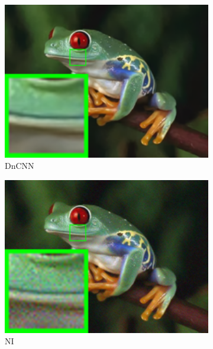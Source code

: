 \begin{figure}
\begin{subfigure}[t]{0.19\textwidth}
        \includegraphics[width=1\textwidth]{images/guided/nc/resize_br_DnCNN_frog.png}
		\caption{DnCNN}
    \end{subfigure}
    \hfill
    \begin{subfigure}[t]{0.19\textwidth}
        \centering
        \includegraphics[width=1\textwidth]{images/guided/nc/resize_br_NI_frog.png}
\caption{NI}
    \end{subfigure}
    \hfill
    \begin{subfigure}[t]{0.19\textwidth}
        \centering

\end{subfigure}
\end{figure}
